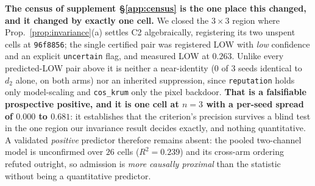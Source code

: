 \documentclass{article}
\begin{document}
\noindent \textbf{The census of supplement §\ref{app:census} is the one place this changed, and it changed by exactly one cell.} We closed the $3\times3$ region where Prop.~\ref{prop:invariance}(a) settles C2 algebraically, registering its two unspent cells at \texttt{96f8856}; the single certified pair was registered LOW with \emph{low} confidence and an explicit \texttt{uncertain} flag, and measured LOW at $0.263$. Unlike every predicted-LOW pair above it is neither a near-identity ($0$ of $3$ seeds identical to $d_2$ alone, on both arms) nor an inherited suppression, since \texttt{reputation} holds only model-scaling and \texttt{cos\_krum} only the pixel backdoor. \textbf{That is a falsifiable prospective positive, and it is one cell at $n{=}3$ with a per-seed spread of $0.000$ to $0.681$}: it establishes that the criterion's precision survives a blind test in the one region our invariance result decides exactly, and nothing quantitative. A validated \emph{positive} predictor therefore remains absent: the pooled two-channel model is unconfirmed over $26$ cells ($R^2 = 0.239$) and its cross-arm ordering refuted outright, so admission is \emph{more causally proximal} than the statistic without being a quantitative predictor.
\end{document}
